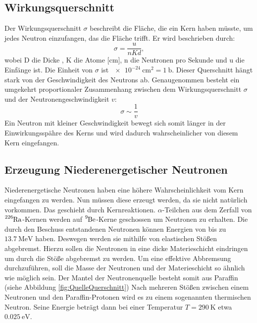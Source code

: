 \subsection{Wirkungsquerschnitt}
\label{subsec:Wirkungsquerschnitt}
Der Wirkungsquerschnitt $\sigma$ beschreibt die Fläche, die ein Kern haben müsste, um jedes Neutron einzufangen, das die Fläche trifft.
Er wird beschrieben durch:
\begin{equation*}
    \sigma =\frac{u}{nKd} ,
\end{equation*}
wobei D die Dicke , K die Atome [\si{\centi\meter}], n die Neutronen pro Sekunde und u die Einfänge ist.
Die Einheit von $\sigma$ ist $\SI{e-24}{\centi\metre\squared} = \SI{1}{\barn}$.
Dieser Querschnitt hängt stark von der Geschwindigkeit des Neutrons ab.
Genaugenommen besteht ein umgekehrt proportionaler Zusammenhang zwischen dem Wirkungsquerschnitt $\sigma$ und der Neutronengeschwindigkeit $v$:
\begin{equation*}
    \sigma \sim \frac{1}{v}
\end{equation*}
Ein Neutron mit kleiner Geschwindigkeit bewegt sich somit länger in der Einwirkungsspähre des Kerns und wird dadurch wahrscheinlicher von diesem Kern eingefangen.

\subsection{Erzeugung Niederenergetischer Neutronen}
\label{subsec:NeutronenHerstellen}
Niederenergetische Neutronen haben eine höhere Wahrscheinlichkeit vom Kern eingefangen zu werden.
Nun müssen diese erzeugt werden, da sie nicht natürlich vorkommen.
Das geschieht durch Kernreaktionen.
$\alpha$-Teilchen aus dem Zerfall von $\ce{^{226}Ra}$-Kernen werden auf $\ce{^{9}Be}$-Kerne geschossen um Neutronen zu erhalten.
Die durch den Beschuss entstandenen Neutronen können Energien von bis zu $\SI{13.7}{\mega\electronvolt}$ haben.
Deswegen werden sie mithilfe von elastischen Stößen abgebremst.
Hierzu sollen die Neutronen in eine dicke Materieschicht eindringen um durch die Stöße abgebremst zu werden.
Um eine effektive Abbremsung durchzuführen, soll die Masse der Neutronen und der Materieschicht so ähnlich wie möglich sein.
Der Mantel der Neutronenquelle besteht somit aus Paraffin (siehe Abbildung \ref{fig:QuelleQuerschnitt})
Nach mehreren Stößen zwischen einem Neutronen und den Paraffin-Protonen wird es zu einem sogenannten thermischen Neutron.
Seine Energie beträgt dann bei einer Temperatur $T = \SI{290}{\kelvin}$ etwa $\SI{0.025}{\electronvolt}$.

